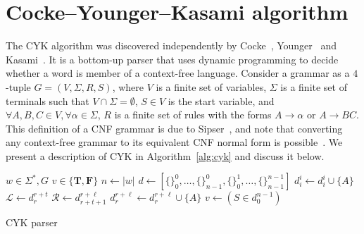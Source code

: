 \documentclass[12pt]{article}
\begin{document}
\section{Cocke–Younger–Kasami algorithm}\label{sec:cyk}

The CYK algorithm was discovered independently by Cocke~\cite{}, Younger~\cite{} and Kasami~\cite{}. It is a bottom-up parser that uses dynamic programming to decide whether a word is member of a context-free language. Consider a grammar as a $4$-tuple $G = (V, \Sigma, R, S)$, where $V$ is a finite set of variables, $\Sigma$ is a finite set of terminals such that $V \cap \Sigma = \emptyset$, $S \in V$ is the start variable, and $\forall A, B, C \in V, \forall \alpha \in \Sigma$, $R$ is a finite set of rules with the forms $A \rightarrow \alpha$ or $A \rightarrow BC$. This definition of a CNF grammar is due to Sipser~\cite{}, and note that converting any context-free grammar to its equivalent CNF normal form is possible~\cite{}. We present a description of CYK in Algorithm~\ref{alg:cyk} and discuss it below.

\begin{algorithm}[ht]
  \begin{algorithmic}[1]
    \REQUIRE{} $w \in \Sigma^{*}, G$
    \ENSURE{} $v \in \{\mathbf{T}, \mathbf{F}\}$
    \STATE{} $n \leftarrow |w|$
    \STATE{} $d \leftarrow [\{\}_{0}^{0}, \dots, \{\}_{n - 1}^{0}, \{\}_{0}^{1}, \dots, \{\}_{n - 1}^{n - 1}]$
        \STATE{} $d_{i}^{i} \leftarrow d_{i}^{i} \cup \{A\}$
      \ENDIF{}
    \ENDFOR{}
          \STATE{} $\mathcal{L} \leftarrow d_{r}^{r + t}$
          \STATE{} $\mathcal{R} \leftarrow d_{r + t + 1}^{r + \ell}$
              \STATE{} $d_{r}^{r + \ell} \leftarrow d_{r}^{r + \ell} \cup \{A\}$
            \ENDIF{}
          \ENDFOR{}
        \ENDFOR{}
      \ENDFOR{}
    \ENDFOR{}
    \STATE{} $v \leftarrow (S \in d_{0}^{n - 1})$
  \end{algorithmic}
  \caption{CYK parser}\label{alg:cyk}
\end{algorithm}
\end{document}
